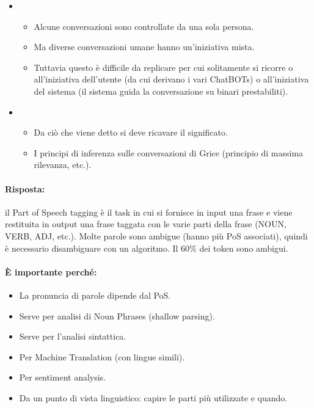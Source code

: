 \begin{itemize}
\begin{itemize}
    \end{itemize}
  \item {}
    \begin{itemize}
      \item Alcune conversazioni sono controllate da una sola persona. 
      \item Ma diverse conversazioni umane hanno un'iniziativa mista. 
      \item Tuttavia questo è difficile da replicare per cui solitamente si ricorre o all'iniziativa dell'utente (da cui derivano i vari ChatBOTs) o all'iniziativa del sistema (il sistema guida la conversazione su binari prestabiliti). 
    \end{itemize}
  \item {}
    \begin{itemize}
      \item Da ciò che viene detto si deve ricavare il significato. 
      \item I principi di inferenza sulle conversazioni di Grice (principio di massima rilevanza, etc.).
    \end{itemize}
\end{itemize}



\paragraph{Risposta:} il Part of Speech tagging è il task in cui si fornisce in input una frase e viene restituita in output una frase taggata con le varie parti della frase (NOUN, VERB, ADJ, etc.). Molte parole sono ambigue (hanno più PoS associati), quindi è necessario disambiguare con un algoritmo. Il 60\% dei token sono ambigui. 

\paragraph{È importante perché:}

\begin{itemize}
  \item La pronuncia di parole dipende dal PoS. 
  \item Serve per analisi di Noun Phrases (shallow parsing). 
  \item Serve per l'analisi sintattica. 
  \item Per Machine Translation (con lingue simili). 
  \item Per sentiment analysis. 
  \item Da un punto di vista linguistico: capire le parti più utilizzate e quando.
\end{itemize}

